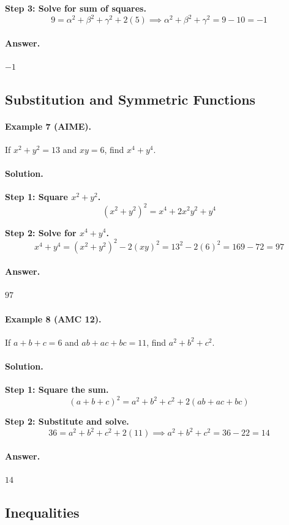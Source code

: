 \documentclass[12pt]{extarticle}
\begin{document}
\textbf{Step 3: Solve for sum of squares.}
\[
9 = \alpha^2+\beta^2+\gamma^2 + 2(5) \implies \alpha^2+\beta^2+\gamma^2 = 9 - 10 = -1
\]

\paragraph{Answer.} $\boxed{-1}$

\subsection{Substitution and Symmetric Functions}

\paragraph{Example 7 (AIME).} If $x^2 + y^2 = 13$ and $xy = 6$, find $x^4 + y^4$.

\paragraph{Solution.}
\textbf{Step 1: Square $x^2+y^2$.}
\[
(x^2+y^2)^2 = x^4 + 2x^2y^2 + y^4
\]

\textbf{Step 2: Solve for $x^4+y^4$.}
\[
x^4+y^4 = (x^2+y^2)^2 - 2(xy)^2 = 13^2 - 2(6)^2 = 169 - 72 = 97
\]

\paragraph{Answer.} $\boxed{97}$

\paragraph{Example 8 (AMC 12).} If $a+b+c = 6$ and $ab+ac+bc = 11$, find $a^2+b^2+c^2$.

\paragraph{Solution.}
\textbf{Step 1: Square the sum.}
\[
(a+b+c)^2 = a^2+b^2+c^2 + 2(ab+ac+bc)
\]

\textbf{Step 2: Substitute and solve.}
\[
36 = a^2+b^2+c^2 + 2(11) \implies a^2+b^2+c^2 = 36 - 22 = 14
\]

\paragraph{Answer.} $\boxed{14}$

\subsection{Inequalities}
\end{document}
